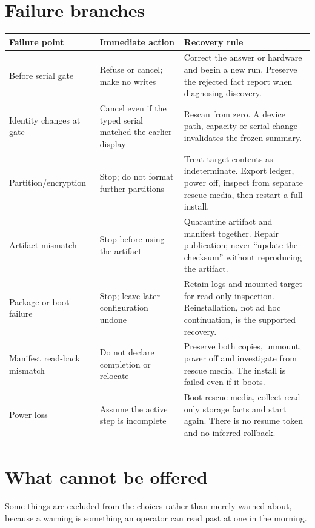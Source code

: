 \section{Failure branches}
\begin{tabularx}{\linewidth}{@{}p{.21\linewidth}p{.28\linewidth}L@{}}
\toprule
\textbf{Failure point} & \textbf{Immediate action} & \textbf{Recovery rule}\\
\midrule
Before serial gate & Refuse or cancel; make no writes & Correct the answer or hardware and begin a new run. Preserve the rejected fact report when diagnosing discovery.\\
Identity changes at gate & Cancel even if the typed serial matched the earlier display & Rescan from zero. A device path, capacity or serial change invalidates the frozen summary.\\
Partition/encryption & Stop; do not format further partitions & Treat target contents as indeterminate. Export ledger, power off, inspect from separate rescue media, then restart a full install.\\
Artifact mismatch & Stop before using the artifact & Quarantine artifact and manifest together. Repair publication; never ``update the checksum'' without reproducing the artifact.\\
Package or boot failure & Stop; leave later configuration undone & Retain logs and mounted target for read-only inspection. Reinstallation, not ad hoc continuation, is the supported recovery.\\
Manifest read-back mismatch & Do not declare completion or relocate & Preserve both copies, unmount, power off and investigate from rescue media. The install is failed even if it boots.\\
Power loss & Assume the active step is incomplete & Boot rescue media, collect read-only storage facts and start again. There is no resume token and no inferred rollback.\\
\bottomrule
\end{tabularx}

\section{What cannot be offered}
Some things are excluded from the choices rather than merely warned about,
because a warning is something an operator can read past at one in the morning.

